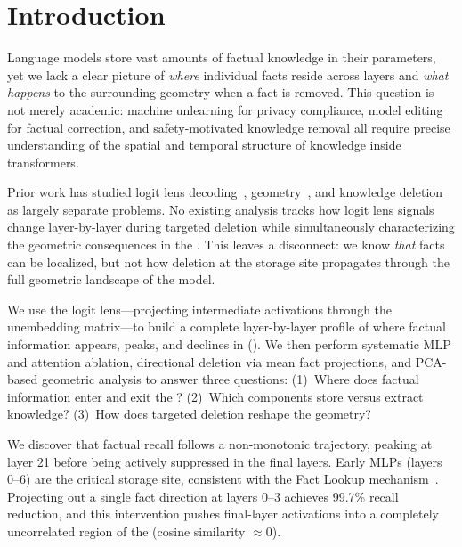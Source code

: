 \section{Introduction}
\label{sec:introduction}

Language models store vast amounts of factual knowledge in their parameters, yet we lack a clear picture of \emph{where} individual facts reside across layers and \emph{what happens} to the surrounding geometry when a fact is removed. This question is not merely academic: machine unlearning for privacy compliance, model editing for factual correction, and safety-motivated knowledge removal all require precise understanding of the spatial and temporal structure of knowledge inside transformers.

 Prior work has studied logit lens decoding~\citep{nostalgebraist2020logitlens, belrose2023tuned}, \residstream geometry~\citep{park2023linear, shai2024belief}, and knowledge deletion~\citep{ghosh2024mechanistic, li2026layer} as largely separate problems. No existing analysis tracks how logit lens signals change layer-by-layer during targeted deletion while simultaneously characterizing the geometric consequences in the \residstream. This leaves a disconnect: we know \emph{that} facts can be localized, but not how deletion at the storage site propagates through the full geometric landscape of the model.

 We use the logit lens---projecting intermediate \residstream activations through the unembedding matrix---to build a complete layer-by-layer profile of where factual information appears, peaks, and declines in \gptmed (). We then perform systematic MLP and attention ablation, directional deletion via mean fact projections, and PCA-based geometric analysis to answer three questions: (1)~Where does factual information enter and exit the \residstream? (2)~Which components store versus extract knowledge? (3)~How does targeted deletion reshape the \residstream geometry?

 We discover that factual recall follows a non-monotonic trajectory, peaking at layer 21 before being actively suppressed in the final layers. Early MLPs (layers 0--6) are the critical storage site, consistent with the Fact Lookup mechanism~\citep{ghosh2024mechanistic}. Projecting out a single fact direction at layers 0--3 achieves 99.7\% recall reduction, and this intervention pushes final-layer activations into a completely uncorrelated region of the \residstream (cosine similarity $\approx 0$).

